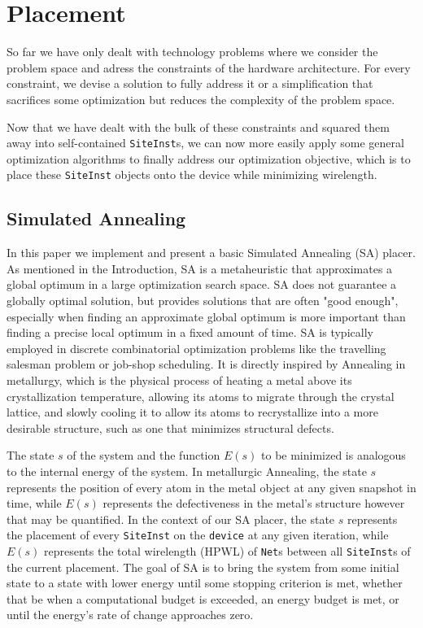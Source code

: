 
\section{Placement}
\label{sec:placement}
So far we have only dealt with technology problems where we consider the problem space and adress the constraints of the hardware architecture. 
For every constraint, we devise a solution to fully address it or a simplification that sacrifices some optimization but reduces the complexity of the problem space. 

Now that we have dealt with the bulk of these constraints and squared them away into self-contained \texttt{SiteInst}s, we can now more easily apply some general optimization algorithms to finally address our optimization objective, which is to place these \texttt{SiteInst} objects onto the device while minimizing wirelength. 

\subsection{Simulated Annealing}
\label{subsec:simulated_annealing}

In this paper we implement and present a basic Simulated Annealing (SA) placer. 
As mentioned in the Introduction, SA is a metaheuristic that approximates a global optimum in a large optimization search space. 
SA does not guarantee a globally optimal solution, but provides solutions that are often "good enough", especially when finding an approximate global optimum is more important than finding a precise local optimum in a fixed amount of time. 
SA is typically employed in discrete combinatorial optimization problems like the travelling salesman problem or job-shop scheduling. 
It is directly inspired by Annealing in metallurgy, which is the physical process of heating a metal above its crystallization temperature, allowing its atoms to migrate through the crystal lattice, and slowly cooling it to allow its atoms to recrystallize into a more desirable structure, such as one that minimizes structural defects. 

The state \(s\) of the system and the function \(E(s)\) to be minimized is analogous to the internal energy of the system. 
In metallurgic Annealing, the state \(s\) represents the position of every atom in the metal object at any given snapshot in time, while \(E(s)\) represents the defectiveness in the metal's structure however that may be quantified. 
In the context of our SA placer, the state \(s\) represents the placement of every \texttt{SiteInst} on the \texttt{device} at any given iteration, while \(E(s)\) represents the total wirelength (HPWL) of \texttt{Net}s between all \texttt{SiteInst}s of the current placement.
The goal of SA is to bring the system from some initial state to a state with lower energy until some stopping criterion is met, whether that be when a computational budget is exceeded, an energy budget is met, or until the energy's rate of change approaches zero. 

